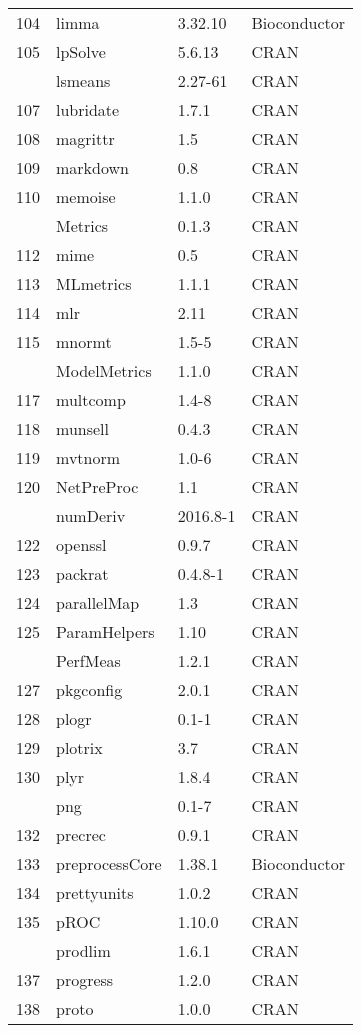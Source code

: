 \begin{longtable}{rlll}
104 & limma & 3.32.10 & Bioconductor\\
105 & lpSolve & 5.6.13 & CRAN\\
\addlinespace
106 & lsmeans & 2.27-61 & CRAN\\
107 & lubridate & 1.7.1 & CRAN\\
108 & magrittr & 1.5 & CRAN\\
109 & markdown & 0.8 & CRAN\\
110 & memoise & 1.1.0 & CRAN\\
\addlinespace
111 & Metrics & 0.1.3 & CRAN\\
112 & mime & 0.5 & CRAN\\
113 & MLmetrics & 1.1.1 & CRAN\\
114 & mlr & 2.11 & CRAN\\
115 & mnormt & 1.5-5 & CRAN\\
\addlinespace
116 & ModelMetrics & 1.1.0 & CRAN\\
117 & multcomp & 1.4-8 & CRAN\\
118 & munsell & 0.4.3 & CRAN\\
119 & mvtnorm & 1.0-6 & CRAN\\
120 & NetPreProc & 1.1 & CRAN\\
\addlinespace
121 & numDeriv & 2016.8-1 & CRAN\\
122 & openssl & 0.9.7 & CRAN\\
123 & packrat & 0.4.8-1 & CRAN\\
124 & parallelMap & 1.3 & CRAN\\
125 & ParamHelpers & 1.10 & CRAN\\
\addlinespace
126 & PerfMeas & 1.2.1 & CRAN\\
127 & pkgconfig & 2.0.1 & CRAN\\
128 & plogr & 0.1-1 & CRAN\\
129 & plotrix & 3.7 & CRAN\\
130 & plyr & 1.8.4 & CRAN\\
\addlinespace
131 & png & 0.1-7 & CRAN\\
132 & precrec & 0.9.1 & CRAN\\
133 & preprocessCore & 1.38.1 & Bioconductor\\
134 & prettyunits & 1.0.2 & CRAN\\
135 & pROC & 1.10.0 & CRAN\\
\addlinespace
136 & prodlim & 1.6.1 & CRAN\\
137 & progress & 1.2.0 & CRAN\\
138 & proto & 1.0.0 & CRAN\\

\end{longtable}
